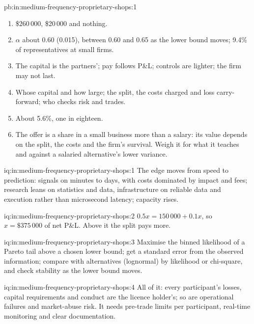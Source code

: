 \begin{solution}{pb:in:medium-frequency-proprietary-shops:1}
\begin{enumerate}
\item \$260\,000, \$20\,000 and nothing.
\item $\alpha$ about 0.60 (0.015), between 0.60 and 0.65 as the lower bound moves; 9.4\% of representatives at small firms.
\item The capital is the partners'; pay follows P\&L; controls are lighter; the firm may not last.
\item Whose capital and how large; the split, the costs charged and loss carry-forward; who checks risk and trades.
\item About 5.6\%, one in eighteen.
\item The offer is a share in a small business more than a salary: its value depends on the split, the costs and the firm's
survival. Weigh it for what it teaches and against a salaried alternative's lower variance.
\end{enumerate}
\end{solution}

\begin{solution}{iq:in:medium-frequency-proprietary-shops:1}
The edge moves from speed to prediction: signals on minutes to days, with costs dominated by impact and fees; research
leans on statistics and data, infrastructure on reliable data and execution rather than microsecond latency; capacity
rises.
\end{solution}

\begin{solution}{iq:in:medium-frequency-proprietary-shops:2}
$0.5x=150\,000+0.1x$, so $x=\$375\,000$ of net P\&L. Above it the split pays more.
\end{solution}

\begin{solution}{iq:in:medium-frequency-proprietary-shops:3}
Maximise the binned likelihood of a Pareto tail above a chosen lower bound; get a standard error from the observed
information; compare with alternatives (lognormal) by likelihood or chi-square, and check stability as the lower bound
moves.
\end{solution}

\begin{solution}{iq:in:medium-frequency-proprietary-shops:4}
All of it: every participant's losses, capital requirements and conduct are the licence holder's; so are operational
failures and market-abuse risk. It needs pre-trade limits per participant, real-time monitoring and clear documentation.
\end{solution}

